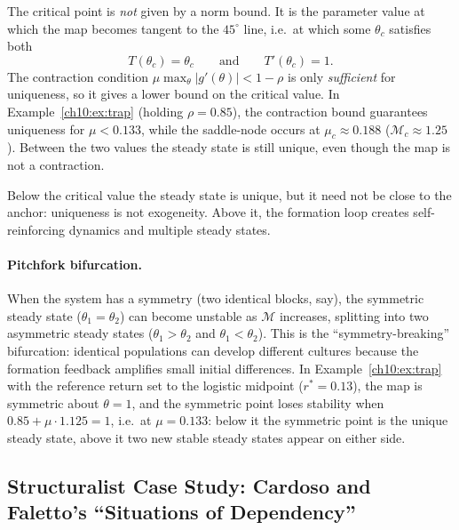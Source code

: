 \documentclass[../structural_economics_book.tex]{subfiles}
\begin{document}
The critical point is \textit{not} given by a norm bound. It is the parameter value at which the map becomes tangent to the $45^\circ$ line, i.e.\ at which some $\theta_c$ satisfies both
\begin{equation}
T(\theta_c) = \theta_c \qquad \text{and} \qquad T'(\theta_c) = 1.
\end{equation}
The contraction condition $\mu\max_\theta|g'(\theta)| < 1-\rho$ is only \textit{sufficient} for uniqueness, so it gives a lower bound on the critical value. In Example~\ref{ch10:ex:trap} (holding $\rho = 0.85$), the contraction bound guarantees uniqueness for $\mu < 0.133$, while the saddle-node occurs at $\mu_c \approx 0.188$ ($\mathcal{M}_c \approx 1.25$). Between the two values the steady state is still unique, even though the map is not a contraction.

Below the critical value the steady state is unique, but it need not be close to the anchor: uniqueness is not exogeneity. Above it, the formation loop creates self-reinforcing dynamics and multiple steady states.

\paragraph{Pitchfork bifurcation.} When the system has a symmetry (two identical blocks, say), the symmetric steady state ($\theta_1 = \theta_2$) can become unstable as $\mathcal{M}$ increases, splitting into two asymmetric steady states ($\theta_1 > \theta_2$ and $\theta_1 < \theta_2$). This is the ``symmetry-breaking'' bifurcation: identical populations can develop different cultures because the formation feedback amplifies small initial differences. In Example~\ref{ch10:ex:trap} with the reference return set to the logistic midpoint ($r^* = 0.13$), the map is symmetric about $\theta = 1$, and the symmetric point loses stability when $0.85 + \mu \cdot 1.125 = 1$, i.e.\ at $\mu = 0.133$: below it the symmetric point is the unique steady state, above it two new stable steady states appear on either side.


\subsection*{Structuralist Case Study: Cardoso and Faletto's ``Situations of Dependency''}
\end{document}
